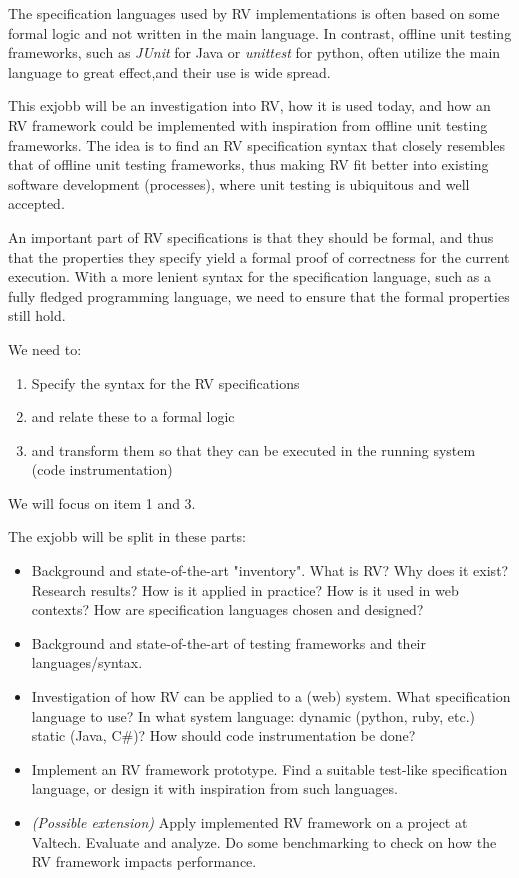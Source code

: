 \documentclass[a4paper,11pt]{kth-mag}
\begin{document}
The specification languages used by RV implementations is often based
on some formal logic and not written in the main language. In contrast,
offline unit testing frameworks, such as \textit{JUnit} for Java or \textit{unittest} for python,
often utilize the main language to great effect,and their use is wide spread.

This exjobb will be an investigation into RV, how it is used today, and how an
RV framework could be implemented with inspiration from offline unit testing
frameworks. The idea is to find an RV specification syntax that closely
resembles that of offline unit testing frameworks, thus making RV fit better into
existing software development (processes), where unit testing is ubiquitous
and well accepted.

An important part of RV specifications is that they should be formal, and thus
that the properties they specify yield a formal proof of correctness for the
current execution. With a more lenient syntax for the specification language, such as
a fully fledged programming language, we need to ensure that the formal properties
still hold.

We need to:

\begin{enumerate}
	\item Specify the syntax for the RV specifications
	\item and relate these to a formal logic
	\item and transform them so that they can be executed in the running system
		(code instrumentation)
\end{enumerate}

We will focus on item 1 and 3.

The exjobb will be split in these parts:

\begin{itemize}
	\item Background and state-of-the-art "inventory". What is RV? Why does it
        exist? Research results? How is it applied in practice? How is it used
        in web contexts? How are specification languages chosen and designed?
	\item Background and state-of-the-art of testing frameworks and their
        languages/syntax.
	\item Investigation of how RV can be applied to a (web) system. What
        specification language to use? In what system language: dynamic
        (python, ruby, etc.) static (Java, C\#)? How should code
        instrumentation be done?
	\item Implement an RV framework prototype. Find a suitable test-like
        specification language, or design it with inspiration from such
        languages.
	\item \textit{(Possible extension)}
		Apply implemented RV framework on a project at Valtech. Evaluate and
        analyze. Do some benchmarking to check on how the RV framework impacts
        performance.
\end{itemize}
\end{document}
